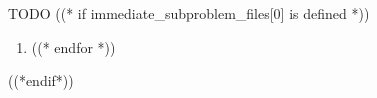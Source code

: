 TODO
((* if immediate_subproblem_files[0] is defined *))\begin{enumerate}
((* for filename in immediate_subproblem_files *))	\item 
((* endfor *))\end{enumerate}((*endif*))
